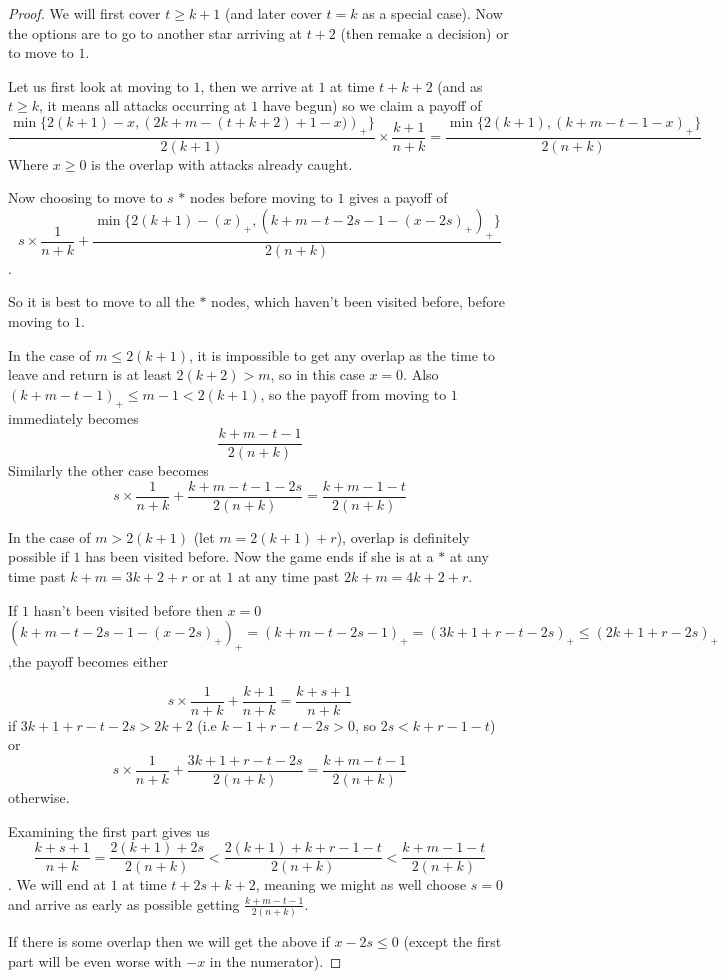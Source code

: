 \documentclass[a4paper,10pt]{article}
\newcommand{\pospart}[1]{\left( #1 \right)_{+}}
\theoremstyle{definition}
\theoremstyle{definition}
\theoremstyle{remark}
\theoremstyle{definition}
\begin{document}
\begin{proof}
We will first cover $t \geq k+1$ (and later cover $t=k$ as a special case). Now the options are to go to another star arriving at $t+2$ (then remake a decision) or to move to $1$.

Let us first look at moving to $1$, then we arrive at $1$ at time $t+k+2$ (and as $t \geq k$, it means all attacks occurring at $1$ have begun) so we claim a payoff of
$$\frac{\min\{2(k+1)-x,\pospart{2k+m-(t+k+2)+1-x)}\}}{2(k+1)} \times \frac{k+1}{n+k}=\frac{\min\{2(k+1),\pospart{k+m-t-1-x}\}}{2(n+k)}$$
Where $x \geq 0$ is the overlap with attacks already caught.

Now choosing to move to $s$ $*$ nodes before moving to $1$ gives a payoff of
$$s \times \frac{1}{n+k} + \frac{\min \{2(k+1)-\pospart{x},\pospart{k+m-t-2s-1-\pospart{x-2s}} \}}{2(n+k)}$$.

So it is best to move to all the $*$ nodes, which haven't been visited before, before moving to $1$.

In the case of $m \leq 2(k+1)$, it is impossible to get any overlap as the time to leave and return is at least $2(k+2) > m$, so in this case $x=0$. Also $\pospart{k+m-t-1} \leq m-1 < 2(k+1)$, so the payoff from moving to $1$ immediately becomes
$$\frac{k+m-t-1}{2(n+k)}$$
Similarly the other case becomes
$$s \times \frac{1}{n+k} + \frac{k+m-t-1-2s}{2(n+k)}=\frac{k+m-1-t}{2(n+k)}$$

In the case of $m > 2(k+1)$ (let $m=2(k+1)+r$), overlap is definitely possible if $1$ has been visited before. Now the game ends if she is at a $*$ at any time past $k+m = 3k+2+r$ or at $1$ at any time past $2k+m = 4k+2+r$.

If $1$ hasn't been visited before then $x=0$ $\pospart{k+m-t-2s-1-\pospart{x-2s}}=\pospart{k+m-t-2s-1}=\pospart{3k+1+r-t-2s} \leq \pospart{2k+1+r-2s}$,the payoff becomes either

$$s \times \frac{1}{n+k} +\frac{k+1}{n+k}=\frac{k+s+1}{n+k}$$ if $3k+1+r-t-2s > 2k+2$ (i.e $k-1+r-t-2s > 0$, so $2s<k+r-1-t$)
\\
or
$$s \times \frac{1}{n+k} +\frac{3k+1+r-t-2s}{2(n+k)}=\frac{k+m-t-1}{2(n+k)}$$ otherwise.

Examining the first part gives us
$$\frac{k+s+1}{n+k}=\frac{2(k+1)+2s}{2(n+k)} < \frac{2(k+1)+k+r-1-t}{2(n+k)}< \frac{k+m-1-t}{2(n+k)}$$.
We will end at $1$ at time $t+2s+k+2$, meaning we might as well choose $s=0$ and arrive as early as possible getting $\frac{k+m-t-1}{2(n+k)}$.

If there is some overlap then we will get the above if $x-2s \leq 0$ (except the first part will be even worse with $-x$ in the numerator).


\end{proof}
\end{document}
